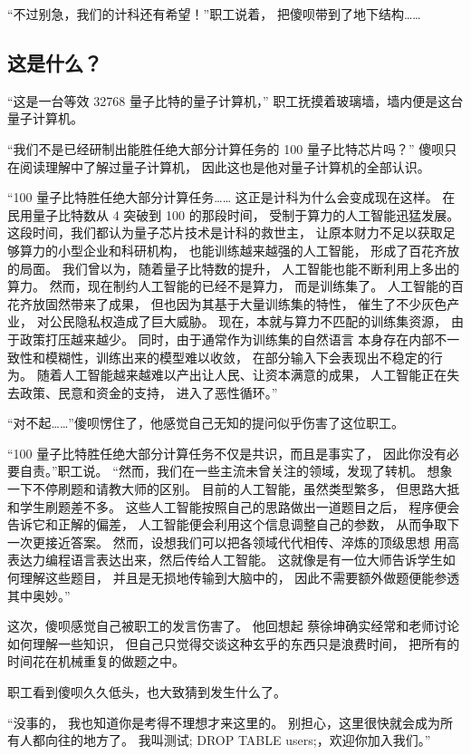 \documentclass[UTF8,a4paper,11pt]{ctexart}
\newcommand{\p}{傻呗} %
\newcommand{\q}{蔡徐坤} %
\newcommand{\R}{测试; DROP TABLE users;} %
\begin{document}
“不过别急，我们的计科还有希望！”职工说着，
把\p 带到了地下结构……

\subsection{这是什么？}
“这是一台等效 32768 量子比特的量子计算机，”
职工抚摸着玻璃墙，墙内便是这台量子计算机。

“我们不是已经研制出能胜任绝大部分计算任务的
100 量子比特芯片吗？”
\p 只在阅读理解中了解过量子计算机，
因此这也是他对量子计算机的全部认识。

“100 量子比特胜任绝大部分计算任务……
这正是计科为什么会变成现在这样。
在民用量子比特数从 4 突破到 100 的那段时间，
受制于算力的人工智能迅猛发展。
这段时间，我们都认为量子芯片技术是计科的救世主，
让原本财力不足以获取足够算力的小型企业和科研机构，
也能训练越来越强的人工智能，
形成了百花齐放的局面。
我们曾以为，随着量子比特数的提升，
人工智能也能不断利用上多出的算力。
然而，现在制约人工智能的已经不是算力，
而是训练集了。
人工智能的百花齐放固然带来了成果，
但也因为其基于大量训练集的特性，
催生了不少灰色产业，
对公民隐私权造成了巨大威胁。
现在，本就与算力不匹配的训练集资源，
由于政策打压越来越少。
同时，由于通常作为训练集的自然语言
本身存在内部不一致性和模糊性，训练出来的模型难以收敛，
在部分输入下会表现出不稳定的行为。
随着人工智能越来越难以产出让人民、让资本满意的成果，
人工智能正在失去政策、民意和资金的支持，
进入了恶性循环。”

“对不起……”\p 愣住了，他感觉自己无知的提问似乎伤害了这位职工。

“100 量子比特胜任绝大部分计算任务不仅是共识，而且是事实了，
因此你没有必要自责。”职工说。
“然而，我们在一些主流未曾关注的领域，发现了转机。
想象一下不停刷题和请教大师的区别。
目前的人工智能，虽然类型繁多，
但思路大抵和学生刷题差不多。
这些人工智能按照自己的思路做出一道题目之后，
程序便会告诉它和正解的偏差，
人工智能便会利用这个信息调整自己的参数，
从而争取下一次更接近答案。
然而，设想我们可以把各领域代代相传、淬炼的顶级思想
用高表达力编程语言表达出来，然后传给人工智能。
这就像是有一位大师告诉学生如何理解这些题目，
并且是无损地传输到大脑中的，
因此不需要额外做题便能参透其中奥妙。”

这次，\p 感觉自己被职工的发言伤害了。
他回想起 \q 确实经常和老师讨论如何理解一些知识，
但自己只觉得交谈这种玄乎的东西只是浪费时间，
把所有的时间花在机械重复的做题之中。

职工看到\p 久久低头，也大致猜到发生什么了。

“没事的，
我也知道你是考得不理想才来这里的。
别担心，这里很快就会成为所有人都向往的地方了。
我叫\R，欢迎你加入我们。”
\end{document}
